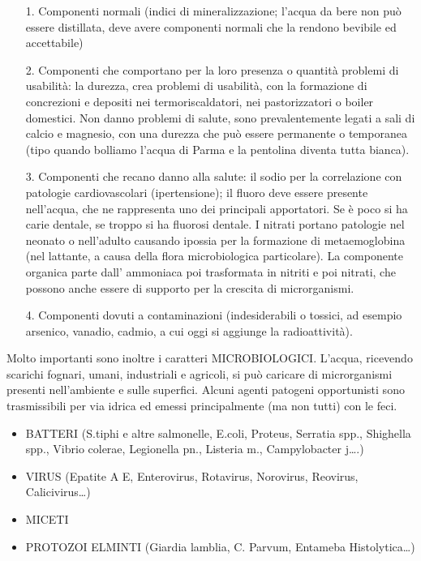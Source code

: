 \begin{itemize}
\item[1.]
  Componenti normali (indici di mineralizzazione; l'acqua da bere non
  può essere distillata, deve avere componenti normali che la rendono
  bevibile ed accettabile)
\item[2.]
  Componenti che comportano per la loro presenza o quantità problemi di
  usabilità: la durezza, crea problemi di usabilità, con la formazione
  di concrezioni e depositi nei termoriscaldatori, nei pastorizzatori o
  boiler domestici. Non danno problemi di salute, sono prevalentemente
  legati a sali di calcio e magnesio, con una durezza che può essere
  permanente o temporanea (tipo quando bolliamo l'acqua di Parma e la
  pentolina diventa tutta bianca).
\item[3.]
  Componenti che recano danno alla salute: il sodio per la correlazione
  con patologie cardiovascolari (ipertensione); il fluoro deve essere
  presente nell'acqua, che ne rappresenta uno dei principali
  apportatori. Se è poco si ha carie dentale, se troppo si ha fluorosi
  dentale. I nitrati portano patologie nel neonato o nell'adulto
  causando ipossia per la formazione di metaemoglobina (nel lattante, a
  causa della flora microbiologica particolare). La componente organica
  parte dall' ammoniaca poi trasformata in nitriti e poi nitrati, che
  possono anche essere di supporto per la crescita di microrganismi.
\item[4.]
  Componenti dovuti a contaminazioni (indesiderabili o tossici, ad
  esempio arsenico, vanadio, cadmio, a cui oggi si aggiunge la
  radioattività).
\end{itemize}

Molto importanti sono inoltre i caratteri MICROBIOLOGICI. L'acqua,
ricevendo scarichi fognari, umani, industriali e agricoli, si può
caricare di microrganismi presenti nell'ambiente e sulle superfici.
Alcuni agenti patogeni opportunisti sono trasmissibili per via idrica ed
emessi principalmente (ma non tutti) con le feci.

\begin{itemize}
\item
  BATTERI (S.tiphi e altre salmonelle, E.coli, Proteus, Serratia spp.,
  Shighella spp., Vibrio colerae, Legionella pn., Listeria m.,
  Campylobacter j\ldots{}.)
\item
  VIRUS (Epatite A E, Enterovirus, Rotavirus, Norovirus, Reovirus,
  Calicivirus\ldots{})
\item
  MICETI
\item
  PROTOZOI ELMINTI (Giardia lamblia, C. Parvum, Entameba
  Histolytica\ldots{})
\end{itemize}

